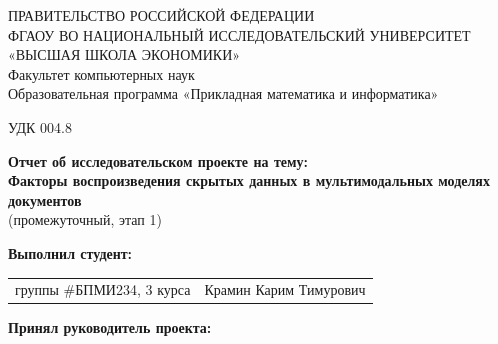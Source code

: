 \begin{titlepage}
\newpage

{
\begin{center}
ПРАВИТЕЛЬСТВО РОССИЙСКОЙ ФЕДЕРАЦИИ\\
ФГАОУ ВО НАЦИОНАЛЬНЫЙ ИССЛЕДОВАТЕЛЬСКИЙ УНИВЕРСИТЕТ\\
«ВЫСШАЯ ШКОЛА ЭКОНОМИКИ»
\\
\bigskip
Факультет компьютерных наук\\
Образовательная программа «Прикладная математика и информатика»
\end{center}
}

\vspace{2em}
УДК 004.8 %
\vspace{4em}

\begin{center}
{\bf Отчет об исследовательском проекте на тему:}\\
{\bf Факторы воспроизведения скрытых данных в мультимодальных моделях документов}\\
(промежуточный, этап 1)
\end{center}

\vspace{2em}

{\bf Выполнил студент: \vspace{2mm}}

{
\begin{tabular}{l@{\hskip 1.5cm}l}
группы \#БПМИ234, 3 курса & Крамин Карим Тимурович \\
\end{tabular}}


\vspace{1em}
{\bf Принял руководитель проекта: \vspace{2mm}}


\end{titlepage}
